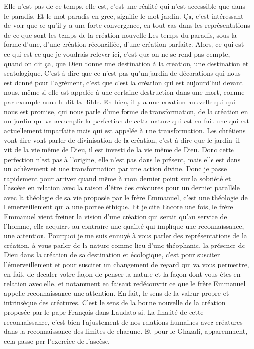 Elle n'est pas de ce temps, elle est, c'est une réalité qui n'est accessible que dans le paradis. Et le mot paradis en grec, signifie le mot jardin. Ça, c'est intéressant de voir que ce qu'il y a une forte convergence, en tout cas dans les représentations de ce que sont les temps de la création nouvelle Les temps du paradis, sous la forme d'une, d'une création réconciliée, d'une création parfaite.
Alors, ce qui est ce qui est ce que je voudrais relever ici, c'est que on ne se rend pas compte, quand on dit ça, que Dieu donne une destination à la création, une destination et scatologique. C'est à dire que ce n'est pas qu'un jardin de décorations qui nous est donné pour l'agrément, c'est que c'est la création qui est aujourd'hui devant nous, même si elle est appelée à une certaine destruction dans une mort, comme par exemple nous le dit la Bible.
Eh bien, il y a une création nouvelle qui qui nous est promise, qui nous parle d'une forme de transformation, de la création en un jardin qui va accomplir la perfection de cette nature qui est en fait une qui est actuellement imparfaite mais qui est appelée à une transformation. Les chrétiens vont dire vont parler de divinisation de la création, c'est à dire que le jardin, il vit de la vie même de Dieu, il est investi de la vie même de Dieu.
Donc cette perfection n'est pas à l'origine, elle n'est pas dans le présent, mais elle est dans un achèvement et une transformation par une action divine. Donc je passe rapidement pour arriver quand même à mon dernier point sur la sobriété et l'ascèse en relation avec la raison d'être des créatures pour un dernier parallèle avec la théologie de sa vie proposée par le frère Emmanuel, c'est une théologie de l'émerveillement qui a une portée éthique.
Et je cite Encore une fois, le frère Emmanuel vient freiner la vision d'une création qui serait qu'au service de l'homme, elle acquiert au contraire une qualité qui implique une reconnaissance, une attention. Pourquoi je me suis ennuyé à vous parler des représentations de la création, à vous parler de la nature comme lieu d'une théophanie, la présence de Dieu dans la création de sa destination et écologique, c'est pour susciter l'émerveillement et pour susciter un changement de regard qui va vous permettre, en fait, de décaler votre façon de penser la nature et la façon dont vous êtes en relation avec elle, et notamment en faisant redécouvrir ce que le frère Emmanuel appelle reconnaissance une attention.
En fait, le sens de la valeur propre et intrinsèque des créatures. C'est le sens de la bonne nouvelle de la création proposée par le pape François dans Laudato si. La finalité de cette reconnaissance, c'est bien l'ajustement de nos relations humaines avec créatures dans la reconnaissance des limites de chacune. Et pour le Ghazali, apparemment, cela passe par l'exercice de l'ascèse.
